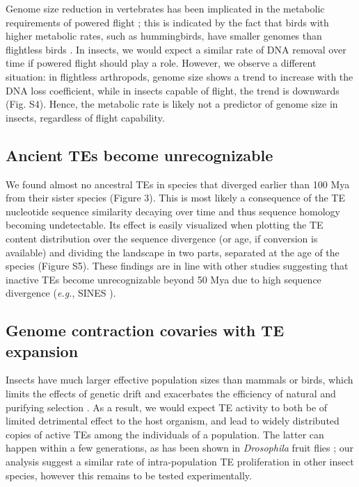 Genome size reduction in vertebrates has been implicated in the
metabolic requirements of powered flight \citep{Wright2014}; this is
indicated by the fact that birds with higher metabolic rates, such as
hummingbirds, have smaller genomes than flightless birds
\citep{Gregory2005}. In insects, we would expect a similar rate of DNA
removal over time if powered flight should play a role. However, we
observe a different situation: in flightless arthropods, genome size
shows a trend to increase with the DNA loss coefficient, while in
insects capable of flight, the trend is downwards (Fig. S4). Hence, the
metabolic rate is likely not a predictor of genome size in insects,
regardless of flight capability.

\subsection*{Ancient TEs become
unrecognizable}\label{ancient-tes-become-unrecognizable}

We found almost no ancestral TEs in species that diverged earlier than
100 Mya from their sister species (Figure 3). This is most likely a
consequence of the TE nucleotide sequence similarity decaying over time
and thus sequence homology becoming undetectable. Its effect is easily
visualized when plotting the TE content distribution over the sequence
divergence (or age, if conversion is available) and dividing the
landscape in two parts, separated at the age of the species (Figure S5).
These findings are in line with other studies suggesting that inactive
TEs become unrecognizable beyond 50 Mya due to high sequence divergence
(\emph{e.g.}, SINES \citep{Shedlock2000}).

\subsection*{Genome contraction covaries with TE
expansion}\label{genome-contraction-covaries-with-te-expansion}

Insects have much larger effective population sizes than mammals or
birds, which limits the effects of genetic drift and exacerbates the
efficiency of natural and purifying selection \citep{Szitenberg2016}. As a
result, we would expect TE activity to both be of limited detrimental
effect to the host organism, and lead to widely distributed copies of
active TEs among the individuals of a population. The latter can happen
within a few generations, as has been shown in \emph{Drosophila} fruit
flies \citep{Kofler2015}; our analysis suggest a similar rate of
intra-population TE proliferation in other insect species, however this
remains to be tested experimentally.

